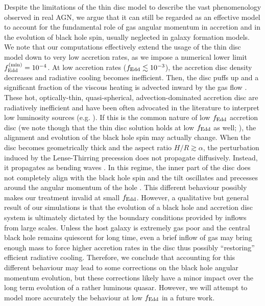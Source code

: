\documentclass[a4paper,fleqn,usenatbib]{mnras}
\begin{document}
Despite the limitations of the thin disc model to describe the vast phenomenology observed in real AGN, we argue that it can still be regarded as an effective model to account for the fundamental role of gas angular momentum in accretion and in the evolution of black hole spin, usually neglected in galaxy formation models.
We note that our computations effectively extend the usage of the thin disc model down to very low accretion rates, as we impose a numerical lower limit $f_{\rm Edd}^{\rm (min)} = 10^{-4}$.
At low accretion rates ($f_{\rm Edd} \lesssim 10^{-3}$), the accretion disc density decreases and radiative cooling becomes inefficient.
Then, the disc puffs up and a significant fraction of the viscous heating is advected inward by the gas flow \citep{narayn+94, narayan+95, blandford+99}.
These hot, optically-thin, quasi-spherical, advection-dominated accretion disc are radiatively inefficient and have been often advocated in the literature to interpret low luminosity sources (e.g. \citealt{lasota+96}).
If this is the common nature of low $f_{\rm Edd}$ accretion disc (we note though that the thin disc solution holds at low $f_{\rm Edd}$ as well; \citealt{chen+95}), the alignment and evolution of the black hole spin may actually change. 
When the disc becomes geometrically thick and the aspect ratio $H/R \gtrsim \alpha$, the perturbation induced by the Lense-Thirring precession does not propagate diffusively.
Instead, it propagates as bending waves \citep{papaloizou+83, papaloizou+95}.
In this regime, the inner part of the disc does not completely align with the black hole spin and the tilt oscillates and precesses around the angular momentum of the hole \citep{lubow+02, fragile+07, nealon+15}.
This different behaviour possibly makes our treatment invalid at small $f_{\rm Edd}$.
However, a qualitative but general result of our simulations is that the evolution of a black hole and accretion disc system is ultimately dictated by the boundary conditions provided by inflows from large scales.
Unless the host galaxy is extremely gas poor and the central black hole remains quiescent for long time, even a brief inflow of gas may bring enough mass to force higher accretion rates in the disc thus possibly ``restoring'' efficient radiative cooling.
Therefore, we conclude that accounting for this different behaviour may lead to some corrections on the black hole angular momentum evolution, but these corrections likely have a minor impact over the long term evolution of a rather luminous quasar.
However, we will attempt to model more accurately the behaviour at low $f_{\rm Edd}$ in a future work.
\end{document}
